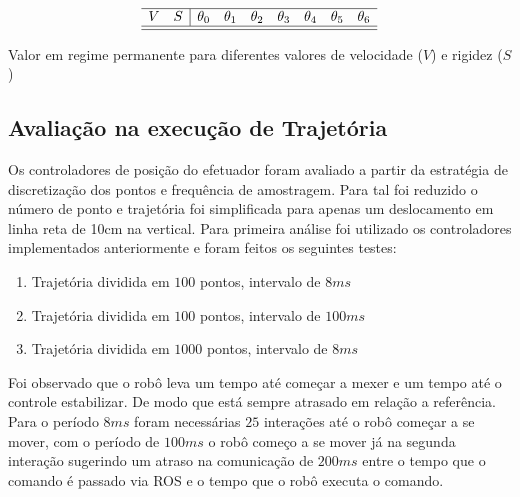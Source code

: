 \begin{table}[H]
    \centering
    $$\begin{array}{cc|ccccccc}
         \hline
         V & S & \theta_0 & \theta_1 & \theta_2 & \theta_3 & \theta_4 & \theta_5 & \theta_6\\
         \hline
         
         \hline
    \end{array}$$
    \caption{Valor em regime permanente para diferentes valores de velocidade ($V$) e rigidez ($S$)}
    \label{tab:jointIdentification_steadstatetable}
\end{table}


\subsection{Avaliação na execução de Trajetória}


Os controladores de posição do efetuador foram avaliado a partir da estratégia de discretização dos pontos e frequência de amostragem. Para tal foi reduzido o número de ponto e trajetória foi simplificada para apenas um deslocamento em linha reta de 10cm na vertical. Para primeira análise foi utilizado os controladores implementados anteriormente e foram feitos os seguintes testes:

\begin{enumerate}
    \item Trajetória dividida em $100$ pontos, intervalo de $8 ms$
    \item Trajetória dividida em $100$ pontos, intervalo de $100 ms$
    \item Trajetória dividida em $1000$ pontos, intervalo de $8 ms$
\end{enumerate}

Foi observado que o robô leva um tempo até começar a mexer e um tempo até o controle estabilizar. De modo que está sempre atrasado em relação a referência. Para o período $8 ms$ foram necessárias $25$ interações até o robô começar a se mover, com o período de $100 ms$ o robô começo a se mover já na segunda interação sugerindo um atraso na comunicação de $200 ms$ entre o tempo que o comando é passado via ROS e o tempo que o robô executa o comando.


